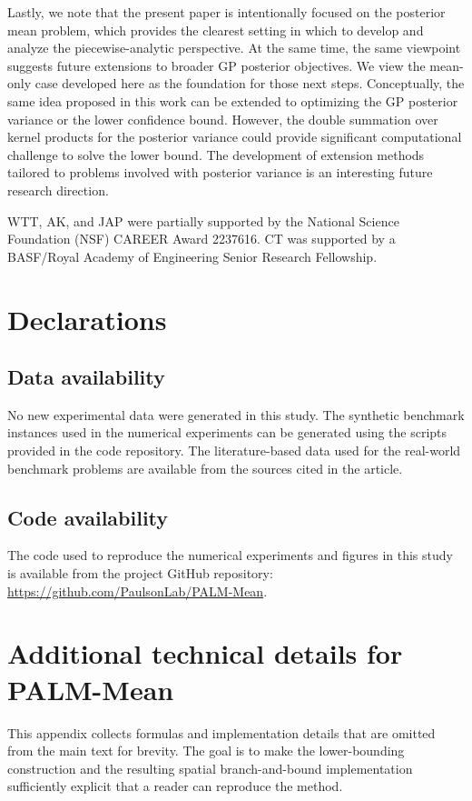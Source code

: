 \documentclass[pdflatex,sn-mathphys-num]{sn-jnl}%
\theoremstyle{thmstyleone}%
\theoremstyle{thmstyletwo}%
\theoremstyle{thmstylethree}%
\begin{document}
Lastly, we note that the present paper is intentionally focused on the posterior mean problem, which provides the clearest setting in which to develop and analyze the piecewise-analytic perspective. At the same time, the same viewpoint suggests future extensions to broader GP posterior objectives. We view the mean-only case developed here as the foundation for those next steps. Conceptually, the same idea proposed in this work can be extended to optimizing the GP posterior variance or the lower confidence bound. However, the double summation over kernel products for the posterior variance could provide significant computational challenge to solve the lower bound. The development of extension methods tailored to problems involved with posterior variance is an interesting future research direction.

 WTT, AK, and JAP were partially supported by the National Science Foundation (NSF) CAREER Award 2237616. CT was supported by a BASF/Royal Academy of Engineering Senior Research Fellowship. 

\section*{Declarations}

\subsection*{Data availability}
No new experimental data were generated in this study. The synthetic benchmark instances used in the numerical experiments can be generated using the scripts provided in the code repository. The literature-based data used for the real-world benchmark problems are available from the sources cited in the article. 

\subsection*{Code availability}
The code used to reproduce the numerical experiments and figures in this study is available from the project GitHub repository: \url{https://github.com/PaulsonLab/PALM-Mean}.

\appendix

\section{Additional technical details for PALM-Mean}

This appendix collects formulas and implementation details that are omitted from the main text for brevity. The goal is to make the lower-bounding construction and the resulting spatial branch-and-bound implementation sufficiently explicit that a reader can reproduce the method.
\end{document}
